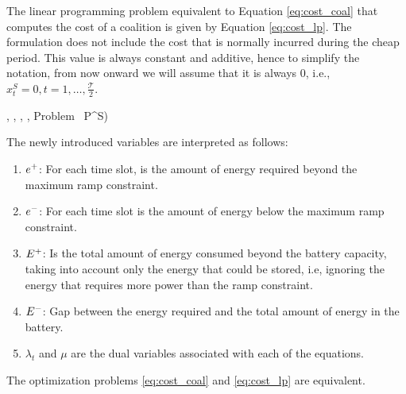 The linear programming problem equivalent to Equation \eqref{eq:cost_coal} that computes the cost of a coalition is given by Equation \eqref{eq:cost_lp}. The formulation does not include the cost that is normally incurred during the cheap period. This value is always constant and additive, hence to simplify the notation, from now onward we will assume that it is always $0$, i.e., $x^S_t = 0, t = 1, \dots, \frac{\mathcal{T}}{2}$.

\begin{mini!}[3]
{\bat, \Ep, \Ene, \ep, \ene}{}{}{Problem \ P^S)}\label{eq:cost_lp}
\end{mini!}

The newly introduced variables are interpreted as follows:

\begin{enumerate}
    \item $e^+$: For each time slot, is the amount of energy required beyond the maximum ramp constraint.
    \item $e^-$: For each time slot is the amount of energy below the maximum ramp constraint.
    \item $E^+$: Is the total amount of energy consumed beyond the battery capacity, taking into account only the energy that could be stored, i.e, ignoring the energy that requires more power than the ramp constraint.
    \item $E^-$: Gap between the energy required and the total amount of energy in the battery.
    \item $\lambda_t$ and $\mu$ are the dual variables associated with each of the equations.
\end{enumerate}

\begin{proposition}\label{prop:equiv}
The optimization problems \eqref{eq:cost_coal} and \eqref{eq:cost_lp} are equivalent.
\end{proposition}

